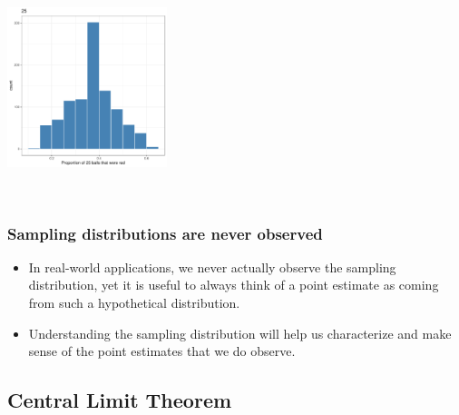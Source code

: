 \documentclass[notes,11pt, aspectratio=169]{beamer}
\begin{document}
\begin{frame}


\begin{center}
\includegraphics[width=0.35\textwidth]{graphs/l05f03.pdf}
\end{center}

$\:$ \\

\end{frame}


\begin{frame}
\frametitle{Sampling distributions are never observed}

\begin{itemize}

\item In real-world applications, we never actually observe the sampling distribution, yet it is useful to always think of a point estimate as coming from such a hypothetical distribution.

\item Understanding the sampling distribution will help us characterize and make sense of the point estimates that we do observe.

\end{itemize}

\end{frame}


\subsection{Central Limit Theorem}
\end{document}
